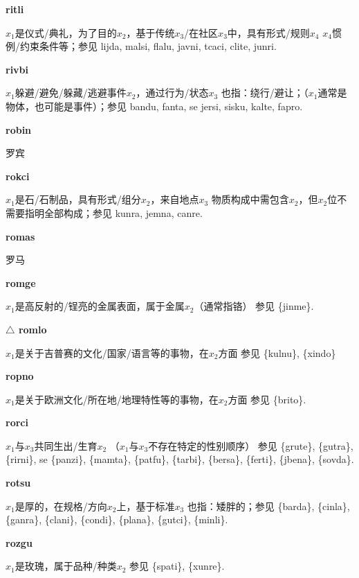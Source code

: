 \documentclass[notitlepage,twocolumn,a4paper,10pt]{book}
\begin{document}
{\sffamily\bfseries ritli}\enspace {\ttfamily\bfseries[        ri'i]}  $x_1$是仪式\slash{}典礼，为了目的$x_2$，基于传统$x_3$\slash{}在社区$x_3$中，具有形式\slash{}规则$x_4$ \textemdash{} $x_4$惯例\slash{}约束条件等；参见 {lijda}, {malsi}, {flalu}, {javni}, {tcaci}, {clite}, {junri}.

{\sffamily\bfseries rivbi}\enspace {\ttfamily\bfseries[riv]}  $x_1$躲避\slash{}避免\slash{}躲藏\slash{}逃避事件$x_2$，通过行为\slash{}状态$x_3$ \textemdash{} 也指：绕行\slash{}避让；（$x_1$通常是物体，也可能是事件）；参见 {bandu}, {fanta}, se {jersi}, {sisku}, {kalte}, {fapro}.

{\sffamily\bfseries robin} 罗宾

{\sffamily\bfseries rokci}\enspace {\ttfamily\bfseries[rok     ro'i]}  $x_1$是石\slash{}石制品，具有形式\slash{}组分$x_2$，来自地点$x_3$ \textemdash{} 物质构成中需包含$x_2$，但$x_2$位不需要指明全部构成；参见 {kunra}, {jemna}, {canre}.

{\sffamily\bfseries romas} 罗马

{\sffamily\bfseries romge}\enspace {\ttfamily\bfseries[rog]}  $x_1$是高反射的\slash{}锃亮的金属表面，属于金属$x_2$（通常指铬） \textemdash{} 参见 \{jinme\}.

{\sffamily\bfseries $\triangle$ romlo} $x_1$是关于吉普赛的文化\slash{}国家\slash{}语言等的事物，在$x_2$方面 \textemdash{} 参见 \{kulnu\}, \{xindo\}

{\sffamily\bfseries ropno}\enspace {\ttfamily\bfseries[ron     ro'o]}  $x_1$是关于欧洲文化\slash{}所在地\slash{}地理特性等的事物，在$x_2$方面 \textemdash{} 参见 \{brito\}.

{\sffamily\bfseries rorci}\enspace {\ttfamily\bfseries[ror]}  $x_1$与$x_3$共同生出\slash{}生育$x_2$ （$x_1$与$x_3$不存在特定的性别顺序） \textemdash{} 参见 \{grute\}, \{gutra\}, \{rirni\}, se \{panzi\}, \{mamta\}, \{patfu\}, \{tarbi\}, \{bersa\}, \{ferti\}, \{jbena\}, \{sovda\}.

{\sffamily\bfseries rotsu}  $x_1$是厚的，在规格\slash{}方向$x_2$上，基于标准$x_3$ \textemdash{} 也指：矮胖的；参见 \{barda\}, \{cinla\}, \{ganra\}, \{clani\}, \{condi\}, \{plana\}, \{gutci\}, \{minli\}.

{\sffamily\bfseries rozgu}  $x_1$是玫瑰，属于品种\slash{}种类$x_2$ \textemdash{} 参见 \{spati\}, \{xunre\}.
\end{document}
